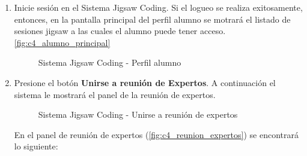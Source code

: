 \begin{enumerate}
	\item Inicie sesión en el Sistema Jigsaw Coding. Si el logueo se realiza exitosamente, entonces, en la pantalla principal del perfil alumno se motrará el listado de sesiones jigsaw a las cuales el alumno puede tener acceso.\autoref{fig:c4_alumno_principal}
	
	\begin{figure}[h!]
		\centering
		\caption{Sistema Jigsaw Coding - Perfil alumno}
		\label{fig:c4_alumno_principal}
	\end{figure}
	
	\item Presione el botón \textbf{Unirse a reunión de Expertos}. A continuación el sistema le mostrará el panel de la reunión de expertos. 
	
	\begin{figure}[h!]
		\centering
		\caption{Sistema Jigsaw Coding - Unirse a reunión de expertos}
		\label{fig:c4_reunion_expertos}
	\end{figure}
	
	En el panel de reunión de expertos (\autoref{fig:c4_reunion_expertos}) se encontrará lo siguiente: 


\end{enumerate}
